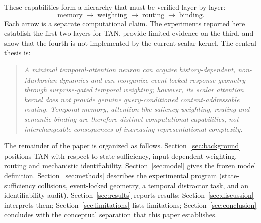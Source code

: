 These capabilities form a hierarchy that must be verified layer by
layer:
\begin{equation*}
  \text{memory} \;\rightarrow\; \text{weighting} \;\rightarrow\;
  \text{routing} \;\rightarrow\; \text{binding}.
\end{equation*}
Each arrow is a separate computational claim.  The experiments reported
here establish the first two layers for TAN, provide limited evidence on
the third, and show that the fourth is not implemented by the current
scalar kernel.  The central thesis is:

\begin{quote}
\emph{A minimal temporal-attention neuron can acquire history-dependent,
non-Markovian dynamics and can reorganize event-locked response geometry
through surprise-gated temporal weighting; however, its scalar attention
kernel does not provide genuine query-conditioned content-addressable
routing.  Temporal memory, attention-like saliency weighting, routing
and semantic binding are therefore distinct computational capabilities,
not interchangeable consequences of increasing representational
complexity.}
\end{quote}

The remainder of the paper is organized as follows.
Section~\ref{sec:background} positions TAN with respect to state
sufficiency, input-dependent weighting, routing and mechanistic
identifiability.  Section~\ref{sec:model} gives the frozen model
definition.  Section~\ref{sec:methods} describes the experimental
program (state-sufficiency collisions, event-locked geometry, a temporal
distractor task, and an identifiability audit).  Section~\ref{sec:results}
reports results; Section~\ref{sec:discussion} interprets them;
Section~\ref{sec:limitations} lists limitations;
Section~\ref{sec:conclusion} concludes with the conceptual separation
that this paper establishes.
